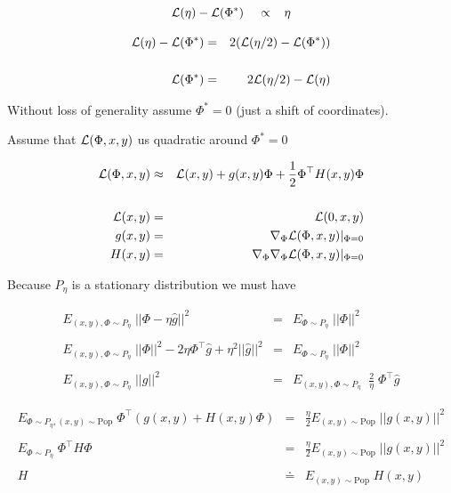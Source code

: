 {
$${\cal L}(\eta) - {\cal L}(\Phi^*)\;\;\;\; \propto \;\;\; \eta$$

\vfill
\begin{eqnarray*}
{\cal L}(\eta) - {\cal L}(\Phi^*) & = & 2({\cal L}(\eta/2) - {\cal L}(\Phi^*)) \\
\\
{\cal L}(\Phi^*) & = & 2{\cal L}(\eta/2) - {\cal L}(\eta)
\end{eqnarray*}


Without loss of generality assume $\Phi^* =0$ (just a shift of coordinates).

\vfill
Assume that ${\cal L}(\Phi,x,y)$ us quadratic around $\Phi^* = 0$

\vfill
\begin{eqnarray*}
{\cal L}(\Phi,x,y) & \approx & {\cal L}(x,y) + g(x,y) \Phi + \frac{1}{2} \Phi^\top H(x,y) \Phi \\
\\
{\cal L}(x,y) & = & {\cal L}(0,x,y) \\
g(x,y) & = & \nabla_\Phi {\cal L}(\Phi,x,y)|_{\Phi = 0} \\
H(x,y) & = & \nabla_\Phi \nabla_\Phi {\cal L}(\Phi,x,y) |_{\Phi = 0}
\end{eqnarray*}

\vfill
Because $P_\eta$ is a stationary distribution we must have

\begin{eqnarray*}
    E_{(x,y),\Phi \sim P_\eta}\; ||\Phi - \eta \hat{g}||^2 & = & E_{\Phi \sim P_\eta}\; ||\Phi||^2 \\
    \\
    E_{(x,y),\Phi \sim P_\eta}\; ||\Phi||^2 -2 \eta \Phi^\top \hat{g} + \eta^2 ||\hat{g}||^2 & = & E_{\Phi \sim P_\eta}\; ||\Phi||^2 \\
    \\
    E_{(x,y),\Phi \sim P_\eta}\;||\hat{g}||^2 & = & E_{(x,y),\Phi \sim P_\eta}\;\;\frac{2}{\eta} \;\Phi^\top \hat{g}
\end{eqnarray*}

  \begin{eqnarray*}
  E_{\Phi \sim P_\eta, (x,y)\sim \mathrm{Pop}}\; \Phi^\top(g(x,y) + H(x,y)\Phi) & = & \frac{\eta}{2} E_{(x,y) \sim \mathrm{Pop}}\; ||g(x,y)||^2 \\
  \\
  E_{\Phi \sim P_\eta}\; \Phi^\top H \Phi & = & \frac{\eta}{2} E_{(x,y) \sim \mathrm{Pop}}\; ||g(x,y)||^2 \\
  \\
  H & \doteq & E_{(x,y) \sim \mathrm{Pop}} \;H(x,y)
  \end{eqnarray*}

}
